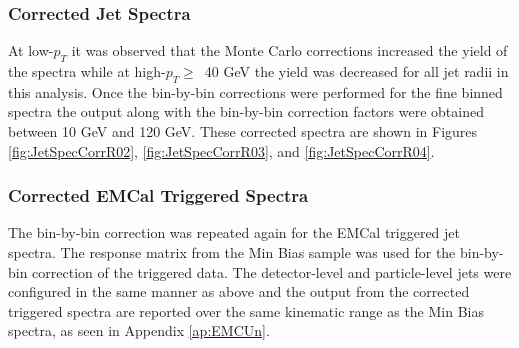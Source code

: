 \subsubsection{Corrected Jet Spectra}


At low-$p_{T}$ it was observed that the Monte Carlo corrections increased the yield of the spectra while at high-$p_{T} \geq \,$ 40 GeV the yield was decreased for all jet radii in this analysis.  Once the bin-by-bin corrections were performed for the fine binned spectra the output along with the bin-by-bin correction factors were obtained between 10 GeV and 120 GeV.  These corrected spectra are shown in Figures \ref{fig:JetSpecCorrR02}, \ref{fig:JetSpecCorrR03}, and \ref{fig:JetSpecCorrR04}.




\subsubsection{Corrected EMCal Triggered Spectra}
The bin-by-bin correction was repeated again for the EMCal triggered jet spectra.  The response matrix from the Min Bias sample was used for the bin-by-bin correction of the triggered data.  The detector-level and particle-level jets were configured in the same manner as above and the output from the corrected triggered spectra are reported over the same kinematic range as the Min Bias spectra, as seen in Appendix \ref{ap:EMCUn}.

